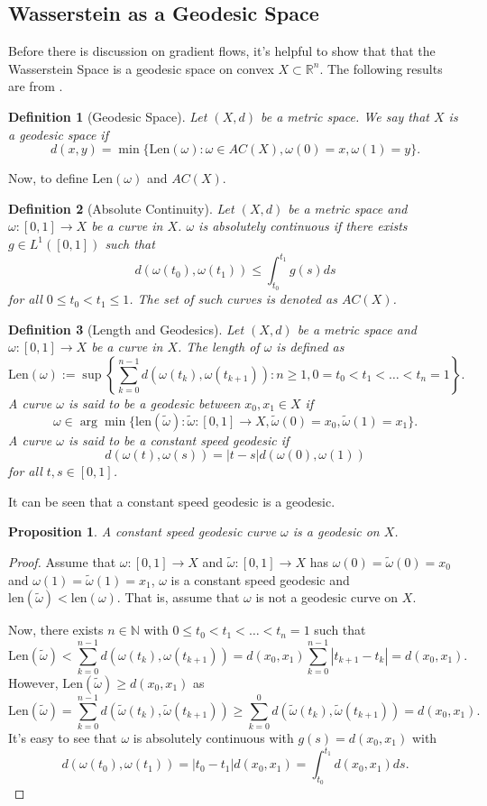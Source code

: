 \documentclass[12pt]{article}
\newcommand{\R}{\mathbb{R}}
\newcommand{\N}{\mathbb{N}}
\theoremstyle{plain}
\newtheorem{prop}{Proposition}[section]
\newtheorem{defn}{Definition}[section]
\numberwithin{equation}{section}
\begin{document}
\subsection{Wasserstein as a Geodesic Space}
Before there is discussion on gradient flows, it's helpful to show that that the Wasserstein Space is a geodesic space on convex $X\subset \R^n$. The following results are from \cite{santambrogio}.
\begin{defn}[Geodesic Space]
  Let $(X,d)$ be a metric space. We say that $X$ is a geodesic space if 
  \[d(x,y) = \min\{\text{Len}(\omega) : \omega\in AC(X),\omega(0) = x, \omega(1) = y\}.\]
\end{defn}
Now, to define $\text{Len}(\omega)$ and $AC(X)$.
\begin{defn}[Absolute Continuity]
  Let $(X,d)$ be a metric space and $\omega : [0,1]\to X$ be a curve in $X$. $\omega$ is absolutely continuous if there exists $g\in L^1([0,1])$ such that 
  \[d(\omega(t_0),\omega(t_1)) \le \int_{t_0}^{t_1} g(s)ds\]
  for all $0\le t_0 < t_1 \le 1$. The set of such curves is denoted as $AC(X)$.
\end{defn}
\begin{defn}[Length and Geodesics]\label{defn:len}
  Let $(X,d)$ be a metric space and $\omega : [0,1]\to X$ be a curve in $X$. The length of $\omega$ is defined as 
  \[\text{Len}(\omega):= \sup\left\{\sum_{k=0}^{n-1}d(\omega(t_k),\omega(t_{k+1})) : n\ge 1, 0 = t_0 <t_1 < \dots < t_n = 1\right\}.\]
  A curve $\omega$ is said to be a geodesic between $x_0,x_1\in X$ if 
  \[\omega \in \arg\min\{\text{len}(\tilde{\omega}) : \tilde{\omega}:[0,1]\to X, \tilde{\omega}(0) = x_0, \tilde{\omega}(1) = x_1\}.\]
  A curve $\omega$ is said to be a constant speed geodesic if 
  \[d(\omega(t),\omega(s)) = |t-s|d(\omega(0),\omega(1))\]
  for all $t,s\in [0,1]$.
\end{defn}
It can be seen that a constant speed geodesic is a geodesic.
\begin{prop}
  A constant speed geodesic curve $\omega$ is a geodesic on $X$.
\end{prop}
\begin{proof}
  Assume that $\omega: [0,1]\to X$ and $\tilde{\omega}: [0,1]\to X$ has $\omega(0) = \tilde{\omega}(0) = x_0$ and $\omega(1)=\tilde{\omega}(1) = x_1$,
  $\omega$ is a constant speed geodesic and $\text{len}(\tilde{\omega}) < \text{len}(\omega)$. That is, assume that $\omega$ is not a geodesic curve on $X$.

  Now, there exists $n\in \N$ with $0 \le t_0 < t_1 < \dots < t_n = 1$ such that 
  \[\text{Len}(\tilde{\omega}) < \sum_{k=0}^{n-1}d(\omega(t_k),\omega(t_{k+1})) = d(x_0,x_1)\sum_{k=0}^{n-1}|t_{k+1}-t_k| = d(x_0,x_1).\]
  However, $\text{Len}(\tilde{\omega}) \ge d(x_0,x_1)$ as 
  \[\text{Len}(\tilde{\omega}) = \sum_{k=0}^{n-1}d(\tilde{\omega}(t_k),\tilde{\omega}(t_{k+1})) \ge \sum_{k=0}^{0}d(\tilde{\omega}(t_k),\tilde{\omega}(t_{k+1})) = d(x_0,x_1).\]
  It's easy to see that $\omega$ is absolutely continuous with $g(s) = d(x_0,x_1)$ with
  \[d(\omega(t_0),\omega(t_1)) = |t_0-t_1|d(x_0,x_1) = \int_{t_0}^{t_1}d(x_0,x_1)ds.\]
\end{proof}
\end{document}
